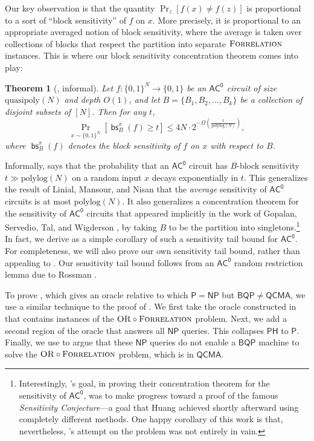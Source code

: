 \documentclass[10pt,a4paper]{article}
\newtheorem{theorem}{Theorem}
\newcommand{\polylog}{\mathrm{polylog}}
\newcommand{\quasipoly}{\mathrm{quasipoly}}
\newcommand{\OR}{\normalfont\textsc{OR}}
\newcommand{\Forrelation}{\normalfont\textsc{Forrelation}}
\DeclareMathOperator{\bs}{\mathsf{bs}}
\begin{document}
Our key observation is that the quantity $\Pr_{z}[f(x) \neq f(z)]$ is proportional to a sort of ``block sensitivity'' of $f$ on $x$. More precisely, it is proportional to an appropriate averaged notion of block sensitivity, where the average is taken over collections of blocks that respect the partition into separate $\Forrelation$ instances. This is where our block sensitivity concentration theorem comes into play:

\begin{theorem}[, informal]
\label{thm:ac0_block_sensitivity_intro}
Let $f: \{0,1\}^N \to \{0,1\}$ be an $\mathsf{AC^0}$ circuit of size $\quasipoly(N)$ and depth $O(1)$, and let $B = \{B_1,B_2,\ldots,B_k\}$ be a collection of disjoint subsets of $[N]$. Then for any $t$,
\[
\Pr_{x \sim \{0,1\}^N} \left[ \bs_B^x(f) \ge t \right] \le 4N\cdot 2^{-\Omega\left(\frac{t}{\polylog(N)}\right)},
\]
where $\bs_B^x(f)$ denotes the block sensitivity of $f$ on $x$ with respect to $B$.
\end{theorem}

Informally,  says that the probability that an $\mathsf{AC^0}$ circuit has $B$-block sensitivity $t \gg \polylog(N)$ on a random input $x$ decays exponentially in $t$. This generalizes the result of Linial, Mansour, and Nisan \cite{LMN93} that the \textit{average} sensitivity of $\mathsf{AC^0}$ circuits is at most $\polylog(N)$. It also generalizes a concentration theorem for the sensitivity of $\mathsf{AC^0}$ circuits that appeared implicitly in the work of Gopalan, Servedio, Tal, and Wigderson \cite{GSTW16}, by taking $B$ to be the partition into singletons.\footnote{Interestingly, \cite{GSTW16}'s goal, in proving their concentration theorem for the sensitivity of $\mathsf{AC^0}$, was to make progress toward a proof of the famous \textit{Sensitivity Conjecture}---a goal that Huang \cite{Hua19} achieved shortly afterward using completely different methods.  One happy corollary of this work is that, nevertheless, \cite{GSTW16}'s attempt on the problem was not entirely in vain.} In fact, we derive  as a simple corollary of such a sensitivity tail bound for $\mathsf{AC^0}$. For completeness, we will also prove our own sensitivity tail bound, rather than appealing to \cite{GSTW16}. Our sensitivity tail bound follows from an $\mathsf{AC^0}$ random restriction lemma due to Rossman \cite{Ros17}.

\bigskip

To prove , which gives an oracle relative to which $\mathsf{P} = \mathsf{NP}$ but $\mathsf{BQP} \neq \mathsf{QCMA}$, we use a similar technique to the proof of . We first take the oracle constructed in  that contains instances of the $\OR \circ \Forrelation$ problem. Next, we add a second region of the oracle that answers all $\mathsf{NP}$ queries. This collapses $\mathsf{PH}$ to $\mathsf{P}$. Finally, we use  to argue that these $\mathsf{NP}$ queries do not enable a $\mathsf{BQP}$ machine to solve the $\OR \circ \Forrelation$ problem, which is in $\mathsf{QCMA}$.
\end{document}
